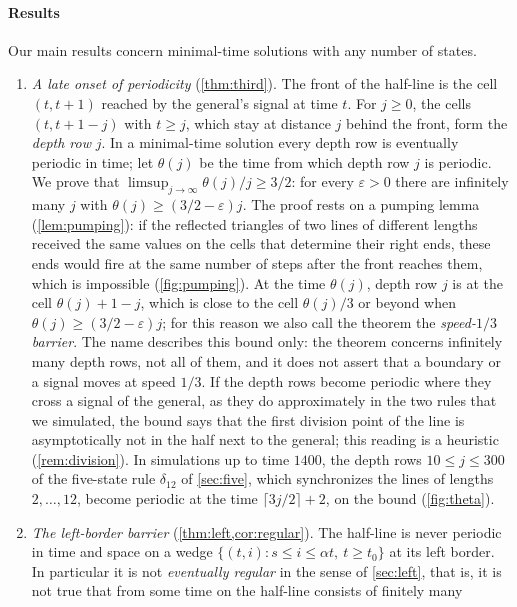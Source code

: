 \paragraph{Results}
Our main results concern minimal-time solutions with any number of states.
\begin{enumerate}[(1)]
\item \emph{A late onset of periodicity} (\cref{thm:third}). The front of the
  half-line is the cell $(t,t+1)$ reached by the general's signal at time $t$.
  For $j\ge0$, the cells $(t,t+1-j)$ with $t\ge j$, which stay at distance $j$
  behind the front, form the \emph{depth row} $j$. In a minimal-time solution
  every depth row is eventually periodic in time; let $\theta(j)$ be the time
  from which depth row $j$ is periodic. We prove that
  $\limsup_{j\to\infty}\theta(j)/j\ge3/2$: for every $\varepsilon>0$ there are
  infinitely many $j$ with $\theta(j)\ge(3/2-\varepsilon)j$. The proof rests on
  a pumping lemma (\cref{lem:pumping}): if the reflected triangles of two lines
  of different lengths received the same values on the cells that determine
  their right ends, these ends would fire at the same number of steps after the
  front reaches them, which is impossible (\cref{fig:pumping}). At the time
  $\theta(j)$, depth row $j$ is at the cell $\theta(j)+1-j$, which is close to
  the cell $\theta(j)/3$ or beyond when $\theta(j)\ge(3/2-\varepsilon)j$; for this
  reason we also call the theorem the \emph{speed-$1/3$ barrier}. The name
  describes this bound only: the theorem concerns infinitely many depth rows, not
  all of them, and it does not assert that a boundary or a signal moves at speed
  $1/3$. If the depth rows become periodic where they cross a signal of the
  general, as they do approximately in the two rules that we simulated, the
  bound says that the first division point of the line is asymptotically not in
  the half next to the general; this reading is a heuristic
  (\cref{rem:division}). In simulations up to time $1400$, the depth rows
  $10\le j\le300$ of the five-state rule $\delta_{12}$ of \cref{sec:five}, which
  synchronizes the lines of lengths $2,\dots,12$, become periodic at the time
  $\lceil 3j/2\rceil+2$, on the bound (\cref{fig:theta}).
\item \emph{The left-border barrier} (\cref{thm:left,cor:regular}). The
  half-line is never periodic in time and space on a wedge
  $\{(t,i):s\le i\le\alpha t,\ t\ge t_0\}$ at its left border. In particular it
  is not \emph{eventually regular} in the sense of \cref{sec:left}, that is, it
  is not true that from some time on the half-line consists of finitely many

\end{enumerate}
